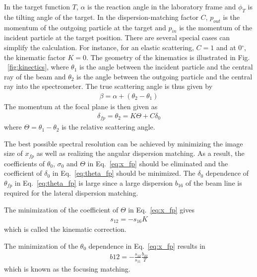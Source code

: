 In the target function $T$, $\alpha$ is the reaction angle in the laboratory frame and $\phi_T$ is the tilting angle of the target. In the dispersion-matching factor $C$, $p_{out}$ is the momentum of the outgoing particle at the target and $p_{in}$ is the momentum of the incident particle at the target position. There are several special cases can simplify the calculation. For instance, for an elastic scattering, $C=1$ and at 0$^\circ$, the kinematic factor $K=0$.
The geometry of the kinematics is illustrated in Fig. ~\ref{fig:kinectics}, where $\theta_1$ is the angle between the incident particle  and the central ray of the beam and $\theta_2$ is the angle between the outgoing particle and the central ray into the spectrometer. The true scattering angle is thus given by
\begin{equation}
    \label{eq:beta}
    \begin{aligned}
    \beta=\alpha+(\theta_2-\theta_1)
    \end{aligned}
\end{equation}
The momentum at the focal plane is then given as
\begin{equation}
    \label{eq:sigma_fp}
    \begin{aligned}
    \delta_{fp} = \theta_2 = K \Theta + C\delta_0
    \end{aligned}
\end{equation}
where $\Theta=\theta_1-\theta_2$ is the relative scattering angle.


The best possible spectral resolution can be achieved by minimizing the image size of $x_{fp}$ as well as realizing the angular dispersion matching. As a result, the coefficients of  $\theta_0$, $\sigma_0$ and $\Theta$ in  Eq.~\ref{eq:x_fp}  should be eliminated and the coefficient of $\delta_0$ in Eq.~\ref{eq:theta_fp} should be minimized. The $\delta_0$ dependence of $\theta_{fp}$ in Eq.~\ref{eq:theta_fp} is large since a large dispersion $b_{16}$ of the beam line is required for the lateral dispersion matching.

The minimization of the coefficient of $\Theta$ in Eq.~\ref{eq:x_fp} gives
 \begin{equation}
    \label{eq:s12}
    \begin{aligned}
        s_{12} = -s_{16}K
    \end{aligned}
\end{equation}
which is called the kinematic correction.

The minimization of the $\theta_0$ dependence in Eq.~\ref{eq:x_fp} results in
 \begin{equation}
    \label{eq:b_12}
    \begin{aligned}
        b12=-\frac{s_{12}}{s_{11}}\frac{b_{22}}{T}
    \end{aligned}
\end{equation}
which is known as the focusing matching.

